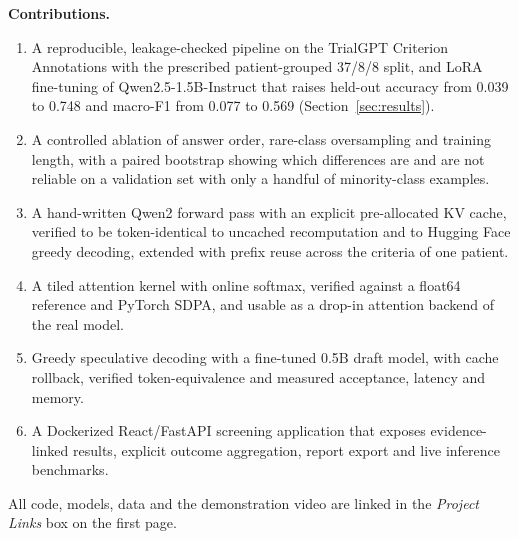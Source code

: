 \textbf{Contributions.}
\begin{enumerate}
\item A reproducible, leakage-checked pipeline on the TrialGPT Criterion Annotations with the
prescribed patient-grouped 37/8/8 split, and LoRA fine-tuning of Qwen2.5-1.5B-Instruct that raises
held-out accuracy from 0.039 to 0.748 and macro-F1 from 0.077 to 0.569 (Section~\ref{sec:results}).
\item A controlled ablation of answer order, rare-class oversampling and training length, with a
paired bootstrap showing which differences are and are not reliable on a validation set with only a
handful of minority-class examples.
\item A hand-written Qwen2 forward pass with an explicit pre-allocated KV cache, verified to be
token-identical to uncached recomputation and to Hugging Face greedy decoding, extended with prefix
reuse across the criteria of one patient.
\item A tiled attention kernel with online softmax, verified against a float64 reference and PyTorch
SDPA, and usable as a drop-in attention backend of the real model.
\item Greedy speculative decoding with a fine-tuned 0.5B draft model, with cache rollback, verified
token-equivalence and measured acceptance, latency and memory.
\item A Dockerized React/FastAPI screening application that exposes evidence-linked results,
explicit outcome aggregation, report export and live inference benchmarks.
\end{enumerate}

All code, models, data and the demonstration video are linked in the \emph{Project Links} box on
the first page.
